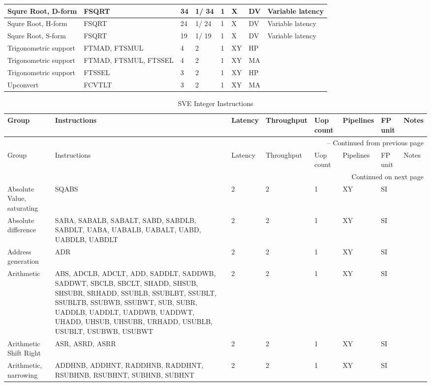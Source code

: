 \begin{longtable}{|p{1in}|p{1in}|l|l|l|p{1in}|l|p{1in}|}
\hline
Squre Root, D-form & FSQRT & 34 & 1/ 34 & 1 & X & DV & Variable latency\\
\hline
Squre Root, H-form & FSQRT & 24 & 1/ 24 & 1 & X & DV & Variable latency\\
\hline
Squre Root, S-form & FSQRT & 19 & 1/ 19 & 1 & X & DV & Variable latency\\
\hline
Trigonometric support & FTMAD, FTSMUL & 4 & 2 & 1 & XY & HP & \\
\hline
Trigonometric support & FTMAD, FTSMUL, FTSSEL & 4 & 2 & 1 & XY & MA & \\
\hline
Trigonometric support & FTSSEL & 3 & 2 & 1 & XY & HP & \\
\hline
Upconvert & FCVTLT & 3 & 2 & 1 & XY & MA & \\
\hline
\end{longtable}
\newpage
\begin{longtable}{|p{1in}|p{1in}|l|l|l|p{1in}|l|p{1in}|}
\caption{SVE Integer Instructions} \\
\hline
Group & Instructions & Latency & Throughput & Uop count & Pipelines & FP unit & Notes\\
\hline
\endfirsthead
\hline
\multicolumn{8}{|r|}{{\tablename\ \thetable{} -- Continued from previous page}} \\
\hline
Group & Instructions & Latency & Throughput & Uop count & Pipelines & FP unit & Notes\\
\hline
\endhead
\hline
\multicolumn{8}{|r|}{{Continued on next page}} \\
\hline
\endfoot
\hline
\endlastfoot
Absolute Value, saturating & SQABS & 2 & 2 & 1 & XY & SI & \\
\hline
Absolute difference & SABA, SABALB, SABALT, SABD, SABDLB, SABDLT, UABA, UABALB, UABALT, UABD, UABDLB, UABDLT & 2 & 2 & 1 & XY & SI & \\
\hline
Address generation & ADR & 2 & 2 & 1 & XY & SI & \\
\hline
Arithmetic & ABS, ADCLB, ADCLT, ADD, SADDLT, SADDWB, SADDWT, SBCLB, SBCLT, SHADD, SHSUB, SHSUBR, SRHADD, SSUBLB, SSUBLBT, SSUBLT, SSUBLTB, SSUBWB, SSUBWT, SUB, SUBR, UADDLB, UADDLT, UADDWB, UADDWT, UHADD, UHSUB, UHSUBR, URHADD, USUBLB, USUBLT, USUBWB, USUBWT & 2 & 2 & 1 & XY & SI & \\
\hline
Arithmetic Shift Right & ASR, ASRD, ASRR & 2 & 2 & 1 & XY & SI & \\
\hline
Arithmetic, narrowing & ADDHNB, ADDHNT, RADDHNB, RADDHNT, RSUBHNB, RSUBHNT, SUBHNB, SUBHNT & 2 & 2 & 1 & XY & SI & \\

\end{longtable}
